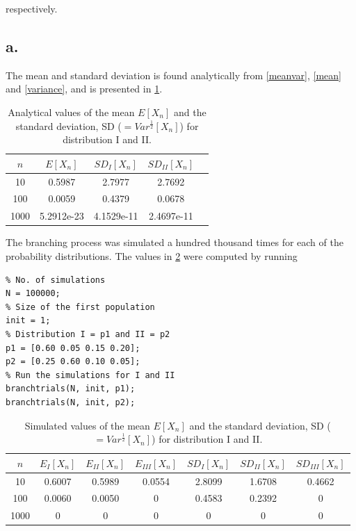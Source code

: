 respectively. 

\subsection*{a.}

The mean and standard deviation is found analytically from \cref{meanvar}, \cref{mean} and \cref{variance}, and is presented in \cref{anatable}.

\begin{table}[!htbp]
\centering
\begin{tabular}{ccccc}
  \hline
  \noalign{\smallskip}
  $n$ & $E[X_n]$ & $SD_I[X_n]$ & $SD_{II}[X_n]$   \\
  \hline
  \noalign{\smallskip}
  10   & 0.5987 & 2.7977 & 2.7692 &    \\
  100  & 0.0059 & 0.4379 & 0.0678 &    \\
  1000 & 5.2912e-23 & 4.1529e-11 & 2.4697e-11 &    \\
  \hline
\end{tabular}
\caption{Analytical values of the mean $E[X_n]$ and the standard deviation, SD ($=Var^{\frac{1}{2}}[X_n]$) for distribution I and II.}
\label{anatable}
\end{table}


The branching process was simulated a hundred thousand times for each of the probability distributions. The values in \cref{simtable} were computed by running

\begin{verbatim}
% No. of simulations
N = 100000;
% Size of the first population
init = 1;
% Distribution I = p1 and II = p2
p1 = [0.60 0.05 0.15 0.20];
p2 = [0.25 0.60 0.10 0.05];
% Run the simulations for I and II
branchtrials(N, init, p1);
branchtrials(N, init, p2);
\end{verbatim}


\begin{table}[!htbp]
\centering
\begin{tabular}{ccccccc}
  \hline
  \noalign{\smallskip}
  $n$ & $E_I[X_n]$ &$E_{II}[X_n]$ &$E_{III}[X_n]$ & $SD_I[X_n]$ & $SD_{II}[X_n]$ & $SD_{III}[X_n]$   \\
  \hline
  \noalign{\smallskip}
  10   & 0.6007 & 0.5989 & 0.0554 & 2.8099 & 1.6708 & 0.4662 \\
  100  & 0.0060 & 0.0050 & 0      & 0.4583 & 0.2392 & 0      \\
  1000 & 0      & 0      & 0      & 0      & 0      & 0      \\
  \hline
\end{tabular}
\caption{Simulated values of the mean $E[X_n]$ and the standard deviation, SD ($=Var^{\frac{1}{2}}[X_n]$) for distribution I and II.}
\label{simtable}
\end{table}

